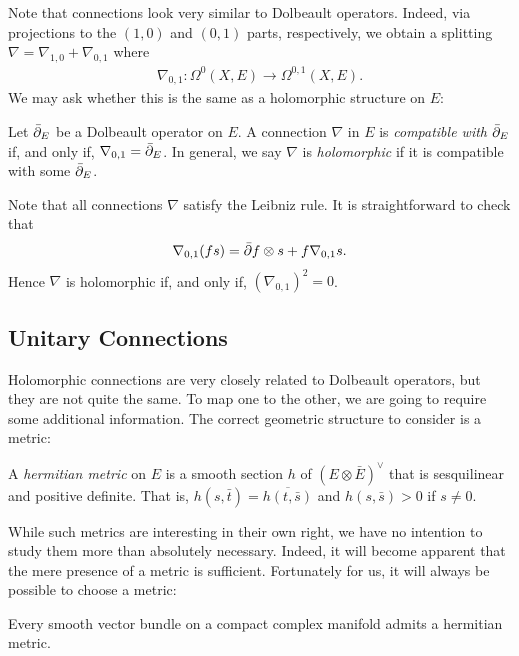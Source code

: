 \documentclass[12pt]{ociamthesis}  %
\begin{document}
Note that connections look very similar to Dolbeault operators.
Indeed, via projections to the $(1,0)$ and $(0,1)$ parts, respectively,
we obtain a splitting $\nabla = \nabla_{1,0} + \nabla_{0,1}$
where
\begin{align*}
  \nabla_{0,1} : \Omega^0(X,E) \to \Omega^{0,1}(X,E).
\end{align*}
We may ask whether this is the same as a holomorphic structure on $E$:

\begin{definition}
  Let $\bar{\partial}_E$ be a Dolbeault operator on $E$.
  A connection $\nabla$ in $E$ is \emph{compatible with $\bar{\partial}_E$}
  if, and only if, $\nabla_{0,1} = \bar{\partial}_E$. In general, we say
  $\nabla$ is \emph{holomorphic} if it is compatible with some
  $\bar{\partial}_E$.
\end{definition}

Note that all connections $\nabla$ satisfy the Leibniz rule. It is
straightforward to check that
\begin{align*}
  \nabla_{0,1} (fs) = \bar{\partial} f\otimes s + f \nabla_{0,1} s.
\end{align*}
Hence $\nabla$ is holomorphic if, and only if, $(\nabla_{0,1})^2 = 0$.

\subsection{Unitary Connections}

Holomorphic connections are very closely related to Dolbeault operators,
but they are not quite the same. To map one to the other, we are going
to require some additional information. The correct geometric
structure to consider is a metric:

\begin{definition}
  A \emph{hermitian metric} on $E$ is a smooth section $h$ of
  $(E\otimes\bar E)^\vee$ that is sesquilinear and positive definite.
  That is, $h(s,\bar t) = \overline{h(t,\bar s)}$ and $h(s,\bar s) > 0$
  if $s \neq 0$.
\end{definition}

While such metrics are interesting in their own right, we have no
intention to study them more than absolutely necessary. Indeed, it will
become apparent that the mere presence of a metric is sufficient.
Fortunately for us, it will always be possible to choose a metric:

\begin{theorem}\label{thm:hermitian_structures_exist}\missingcitation
  Every smooth vector bundle on a compact complex manifold admits a
  hermitian metric.
\end{theorem}
\end{document}
